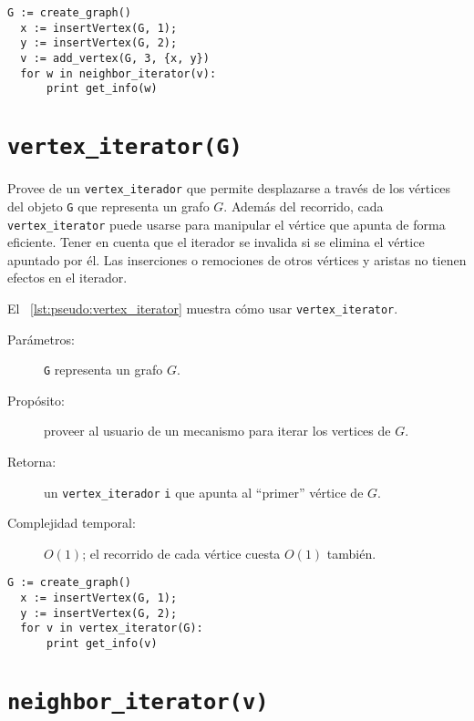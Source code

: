 \documentclass[%
    a4paper,%
    fontsize=12pt,%
    DIV=12,
    twoside,%
    openright,%
    titlepage=true,%
    headsepline,%
    toc=bibliography,%
    parskip=half,%
    cleardoublepage=empty,%
    headings=big,%
]{scrbook}
\makeatletter
\newcommand{\Code}[1]{\lstinline[basicstyle={\ttfamily}]@#1@}
\makeatother
\begin{document}
\begin{lstlisting}[caption={Ejemplo de uso de \Code{add_vertex} para imprimir ``12''.},gobble=2,float=ht,label={lst:pseudo:add_vertex_with_N},emph={add_vertex}]
  G := create_graph()
  x := insertVertex(G, 1);
  y := insertVertex(G, 2);
  v := add_vertex(G, 3, {x, y})
  for w in neighbor_iterator(v):
      print get_info(w)
\end{lstlisting}


\section{\texorpdfstring{\Code{vertex_iterator(G)}}{vertex\_iterator(G)}}%
\label{sec:tad grafo:vertex-iterator}

Provee de un \Code{vertex_iterador} que permite desplazarse a través de los vértices del objeto \Code{G} que representa un grafo $G$.  Además del recorrido, cada \Code{vertex_iterator} puede usarse para manipular el vértice que apunta de forma eficiente.  Tener en cuenta que el iterador se invalida si se elimina el vértice apuntado por él.  Las inserciones o remociones de otros vértices y aristas no tienen efectos en el iterador.

El \lstlistingname~\ref{lst:pseudo:vertex_iterator} muestra cómo usar \Code{vertex_iterator}.

\begin{description}
  \item [Parámetros:] \Code{G} representa un grafo $G$.
  \item [Propósito:] proveer al usuario de un mecanismo para iterar los vertices de $G$.
  \item [Retorna:] un \Code{vertex_iterador} \Code{i} que apunta al ``primer'' vértice de $G$.
  \item [Complejidad temporal:] $O(1)$; el recorrido de cada vértice cuesta $O(1)$ también.
\end{description}


\begin{lstlisting}[caption={Ejemplo de uso de \Code{vertex_iterator} para imprimir alguna permutación de la secuencia 1,2.},gobble=2,float=ht,label={lst:pseudo:vertex_iterator},emph={vertex_iterator}]
  G := create_graph()
  x := insertVertex(G, 1);
  y := insertVertex(G, 2);
  for v in vertex_iterator(G):
      print get_info(v)
\end{lstlisting}


\section{\texorpdfstring{\Code{neighbor_iterator(v)}}{neighbor\_iterator(v)}}%
\label{sec:tad grafo:neighbor-iterator}
\end{document}
